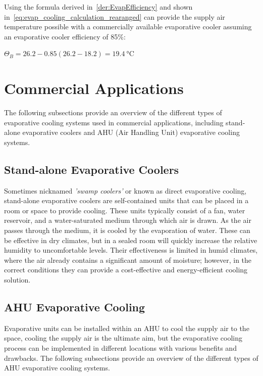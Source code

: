 Using the formula derived in~\autoref{der:EvapEfficiency} and shown in~\autoref{eq:evap_cooling_calculation_rearanged} can provide the supply air temperature possible with a commercially available evaporative cooler assuming an evaporative cooler efficiency of 85\%:

$\Theta_{B} = 26.2 - 0.85(26.2 - 18.2) = \SI{19.4}{\celsius}$

\section{Commercial Applications}
\label{sec:evap_commercial_applications}

The following subsections provide an overview of the different types of evaporative cooling systems used in commercial applications, including stand-alone evaporative coolers and AHU (Air Handling Unit) evaporative cooling systems.

\subsection{Stand-alone Evaporative Coolers}
\label{ssec:standalone_evap_coolers}

Sometimes nicknamed \textit{'swamp coolers'} or known as direct evaporative cooling, stand-alone evaporative coolers are self-contained units that can be placed in a room or space to provide cooling. These units typically consist of a fan, water reservoir, and a water-saturated medium through which air is drawn. As the air passes through the medium, it is cooled by the evaporation of water. These can be effective in dry climates, but in a sealed room will quickly increase the relative humidity to uncomfortable levels. Their effectiveness is limited in humid climates, where the air already contains a significant amount of moisture; however, in the correct conditions they can provide a cost-effective and energy-efficient cooling solution.

\subsection{AHU Evaporative Cooling}
\label{ssec:ahu_evap_cooling}

Evaporative units can be installed within an \gls{AHU} to cool the supply air to the space, cooling the supply air is the ultimate aim, but the evaporative cooling process can be implemented in different locations with various benefits and drawbacks. The following subsections provide an overview of the different types of AHU evaporative cooling systems.


